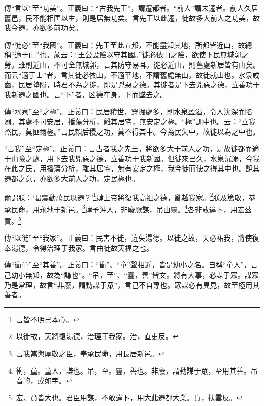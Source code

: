 {\noindent\zhuan{}\fzbyks 傳“言以”至“功美”。正義曰：“古我先王”，謂遷都者。“前人”謂未遷者。前人久居舊邑，民不能相匡以生，則是居無功矣。言先王以此遷，徙故多大前人之功美，故我今遷，亦欲多前功矣。 \par}

{\noindent\zhuan{}\fzbyks 傳“徙必”至“我國”。正義曰：先王至此五邦，不能盡知其地，所都皆近山，故總稱“適于山”也。彖云：“王公設險以守其國。”徙必依山之險，欲使下民無城郭之勞。雖則近山，不可全無城郭，言其防守易耳。徙必近山，則舊處新居皆有山矣。而云“適于山”者，言其徙必依山，不適平地，不謂舊處無山，故徙就山也。水泉咸鹵，民居墊隘，時君不為之徙，即是兇惡之德。其徙者是下去兇惡之德，立善功于我新遷之國也。言“下”者，凶德在身，下而墜去之。 \par}

{\noindent\zhuan{}\fzbyks 傳“水泉”至“之極”。正義曰：民居積世，穿掘處多，則水泉盈溢，令人沈深而陷溺。其處不可安居，播蕩分析，離其居宅，無安定之極。“極”訓中也。云：“立我烝民，莫匪爾極。”言民賴后稷之功，莫不得其中。今為民失中，故徙以為之中也。 \par}

{\noindent\shu{}\fzkt “古我”至“定極”。正義曰：言古者我之先王，將欲多大于前人之功，是故徙都而適于山險之處，用下去我兇惡之德，立善功于我新國。但徙來已久，水泉沉溺，今我在此之民，用播蕩分析，離其居宅，無有安定之極，我今徙而使之得其中也。說其遷都之意，亦欲多大前人之功，定民極也。 \par}

爾謂朕：‘曷震動萬民以遷？’\footnote{言皆不明己本心。}肆上帝將復我高祖之德，亂越我家。\footnote{以徙故，天將復湯德，治理于我家。治，直吏反。}朕及篤敬，恭承民命，用永地于新邑。\footnote{言我當與厚敬之臣，奉承民命，用長居新邑。}肆予沖人，非廢厥謀，吊由靈。\footnote{衝，童。童人，謙也。吊，至。靈，善也。非廢，謂動謀于眾，至用其善。吊音的，或如字。}各非敢違卜，用宏茲賁。\footnote{宏、賁皆大也。君臣用謀，不敢違卜，用大此遷都大業。賁，扶雲反。}

{\noindent\zhuan{}\fzbyks 傳“以徙”至“我家”。正義曰：民害不徙，違失湯德。以徙之故，天必祐我，將使復奉湯德，令得治理于我家。言由徙故天福之也。 \par}

{\noindent\zhuan{}\fzbyks 傳“衝童”至“其善”。正義曰：“衝”、“童”聲相近，皆是幼小之名。自稱“童人”，言己幼小無知，故為“謙也”。“吊，至”、“靈，善”皆文。將有大事，必謀于眾。謀眾乃是常理，故言“非廢，謂動謀于眾”，言己不自專也。眾謀必有異見，故至極用其善者。 \par}

